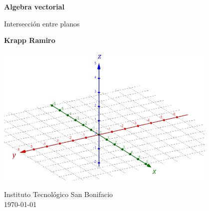 \documentclass{article}
\begin{document}
\begin{titlepage}
    \begin{center}
        \vspace*{1cm}
            
        \Huge
        \textbf{Algebra vectorial}
            
        \vspace{0.5cm}
        \LARGE
        Intersección entre planos            
        \vspace{1.5cm}
            
        \textbf{Krapp Ramiro}
            
        \vfill
            
        \includegraphics[width=0.8\textwidth]{portada.png}
		  \vspace*{2cm}
            
        \Large
        Instituto Tecnológico San Bonifacio\\
        \today
            
    \end{center}
\end{titlepage}
\end{document}

